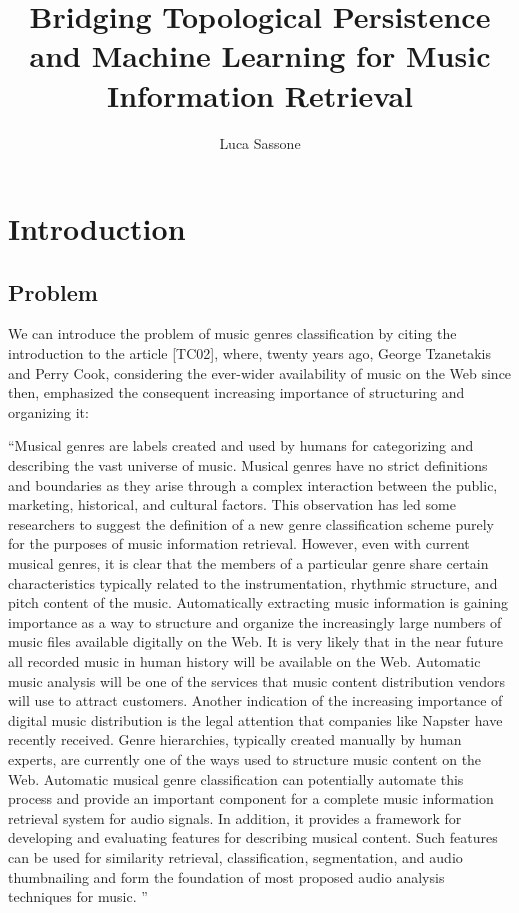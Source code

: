 \documentclass[english, LaM, oneside, noexaminfo]{sapthesis}
\title{Bridging Topological Persistence and Machine Learning for Music Information Retrieval}
\author{Luca Sassone}
\begin{document}
\frontmatter
\maketitle

\tableofcontents

\mainmatter
\nocite{*}

\begin{abstract}

\end{abstract}

\chapter*{Introduction}


\section{Problem}

We can introduce the problem of music genres classification by citing the introduction to the article [TC02], where, twenty years ago, George Tzanetakis and Perry Cook, considering the ever-wider availability of music on the Web since then, emphasized the consequent increasing importance of structuring and organizing it:

“Musical genres are labels created and used by humans
for categorizing and describing the vast universe of
music. Musical genres have no strict definitions and boundaries
as they arise through a complex interaction between the public,
marketing, historical, and cultural factors. This observation
has led some researchers to suggest the definition of a new
genre classification scheme purely for the purposes of music
information retrieval. However, even with current musical
genres, it is clear that the members of a particular genre share
certain characteristics typically related to the instrumentation,
rhythmic structure, and pitch content of the music.
Automatically extracting music information is gaining importance
as a way to structure and organize the increasingly
large numbers of music files available digitally on the Web. It is
very likely that in the near future all recorded music in human
 history will be available on the Web. Automatic music analysis will be one of the services that music content distribution vendors
will use to attract customers. Another indication of the increasing
importance of digital music distribution is the legal attention
that companies like Napster have recently received.
Genre hierarchies, typically created manually by human experts,
are currently one of the ways used to structure music content
on the Web. Automatic musical genre classification can potentially
automate this process and provide an important component
for a complete music information retrieval system for
audio signals. In addition, it provides a framework for developing
and evaluating features for describing musical content.
Such features can be used for similarity retrieval, classification,
segmentation, and audio thumbnailing and form the foundation
of most proposed audio analysis techniques for music. ” 
\end{document}
